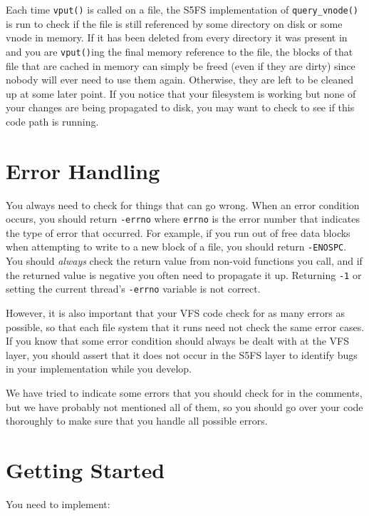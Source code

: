 Each time \texttt{vput()} is called on a file, the S5FS implementation of \texttt{query\_vnode()} is run to check if the file is still referenced by some directory on disk or some vnode in memory. If it has been deleted from every directory it was present in and you are \texttt{vput()}ing the final memory reference to the file, the blocks of that file that are cached in memory can simply be freed (even if they are dirty) since nobody will ever need to use them again. Otherwise, they are left to be cleaned up at some later point. If you notice that your filesystem is working but none of your changes are being propagated to disk, you may want to check to see if this code path is running.

\section{Error Handling}
\label{S5FS Error Handling}

You always need to check for things that can go wrong. When an error condition occurs, you should return \texttt{-errno} where \texttt{errno} is the error number that indicates the type of error that occurred. For example, if you run out of free data blocks when attempting to write to a new block of a file, you should return \texttt{-ENOSPC}. You should \emph{always} check the return value from non-void functions you call, and if the returned value is negative you often need to propagate it up. Returning \texttt{-1} or setting the current thread's \texttt{-errno} variable is not correct.

However, it is also important that your VFS code check for as many errors as possible, so that each file system that it runs need not check the same error cases. If you know that some error condition should always be dealt with at the VFS layer, you should assert that it does not occur in the S5FS layer to identify bugs in your implementation while you develop.

We have tried to indicate some errors that you should check for in the comments, but we have probably not mentioned all of them, so you should go over your code thoroughly to make sure that you handle all possible errors.

\section{Getting Started}

You need to implement:

